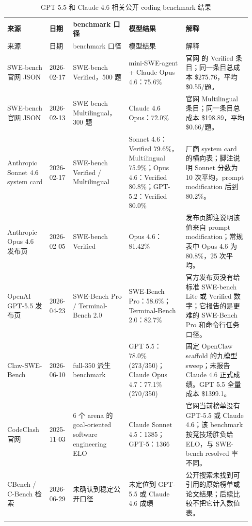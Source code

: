 \documentclass[UTF8,a4paper,11pt]{ctexart}
\begin{document}
\begin{center}
{\scriptsize
\setlength{\tabcolsep}{2pt}
\begin{longtable}{L{3.55cm} C{1.45cm} L{2.85cm} L{2.65cm} L{4.85cm}}
\toprule
来源 & 日期 & benchmark 口径 & 模型结果 & 解释 \\
\midrule
\endfirsthead
\toprule
来源 & 日期 & benchmark 口径 & 模型结果 & 解释 \\
\midrule
\endhead
SWE-bench 官网 JSON & 2026-02-17 & SWE-bench Verified，500 题 & mini-SWE-agent + Claude Opus 4.6：75.6\% & 官网  的 Verified 条目；同一条目总成本 \$275.76，平均 \$0.55/题。 \\
SWE-bench 官网 JSON & 2026-02-13 & SWE-bench Multilingual，300 题 & Claude 4.6 Opus：72.0\% & 官网 Multilingual 条目；同一条目总成本 \$198.89，平均 \$0.66/题。 \\
Anthropic Sonnet 4.6 system card & 2026-02-17 & SWE-bench Verified / Multilingual & Sonnet 4.6：Verified 79.6\%，Multilingual 75.9\%；Opus 4.6：Verified 80.8\%；GPT-5.2：Verified 80.0\% & 厂商 system card 的横向表；脚注说明 Sonnet 分数为 10 次平均，prompt modification 后到 80.2\%。 \\
Anthropic Opus 4.6 发布页 & 2026-02-05 & SWE-bench Verified & Opus 4.6：81.42\% & 发布页脚注说明该值来自 prompt modification；常规表中 Opus 4.6 为 80.8\%，25 次平均。 \\
OpenAI GPT-5.5 发布页 & 2026-04-23 & SWE-Bench Pro / Terminal-Bench 2.0 & SWE-Bench Pro：58.6\%；Terminal-Bench 2.0：82.7\% & 官方发布页没有给标准 SWE-bench Lite 或 Verified 数字；它报告的是更难的 SWE-Bench Pro 和命令行任务口径。 \\
Claw-SWE-Bench & 2026-06-10 & full-350 派生 benchmark & GPT 5.5：78.0\% (273/350)；Claude Opus 4.7：77.1\% (270/350) & 固定 OpenClaw scaffold 的九模型 sweep；未报告 Claude 4.6 正式成绩。GPT 5.5 全量成本 \$1399.1。 \\
CodeClash 官网 & 2025-11-03 & 6 个 arena 的 goal-oriented software engineering ELO & Claude Sonnet 4.5：1385；GPT-5：1366 & 官网当前榜单没有 GPT-5.5 或 Claude 4.6；该 benchmark 按竞技场胜负给 ELO，与 SWE-bench resolved 率不同。 \\
CBench / C-Bench 检索 & 2026-06-29 & 未确认到稳定公开口径 & 未定位到 GPT-5.5 或 Claude 4.6 成绩 & 公开搜索未找到可引用的原始榜单或论文结果；后续比较不把它计入数值表。 \\
\bottomrule
\caption{GPT-5.5 和 Claude 4.6 相关公开 coding benchmark 结果}
\end{longtable}
}
\end{center}
\end{document}
